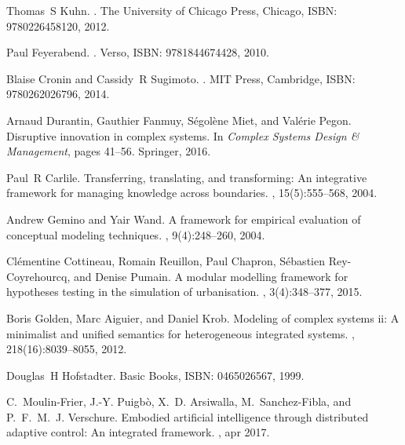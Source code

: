 \documentclass[runningheads,a4paper]{llncs2e/llncs}
\begin{document}
\begin{thebibliography}{10}

Thomas~S Kuhn.
.
\newblock The University of Chicago Press, Chicago, ISBN: 9780226458120, 2012.

Paul Feyerabend.
.
\newblock Verso, ISBN: 9781844674428, 2010.

Blaise Cronin and Cassidy~R Sugimoto.
.
\newblock MIT Press, Cambridge, ISBN: 9780262026796, 2014.

Arnaud Durantin, Gauthier Fanmuy, S{\'e}gol{\`e}ne Miet, and Val{\'e}rie Pegon.
\newblock Disruptive innovation in complex systems.
\newblock In {\em Complex Systems Design \& Management}, pages 41--56.
  Springer, 2016.

Paul~R Carlile.
\newblock Transferring, translating, and transforming: An integrative framework
  for managing knowledge across boundaries.
, 15(5):555--568, 2004.

Andrew Gemino and Yair Wand.
\newblock A framework for empirical evaluation of conceptual modeling
  techniques.
, 9(4):248--260, 2004.

Cl{\'e}mentine Cottineau, Romain Reuillon, Paul Chapron, S{\'e}bastien
  Rey-Coyrehourcq, and Denise Pumain.
\newblock A modular modelling framework for hypotheses testing in the
  simulation of urbanisation.
, 3(4):348--377, 2015.

Boris Golden, Marc Aiguier, and Daniel Krob.
\newblock Modeling of complex systems ii: A minimalist and unified semantics
  for heterogeneous integrated systems.
, 218(16):8039--8055, 2012.

Douglas~H Hofstadter.
\newblock Basic Books, ISBN: 0465026567, 1999.

C.~{Moulin-Frier}, J.-Y. {Puigb{\`o}}, X.~D. {Arsiwalla}, M.~{Sanchez-Fibla},
  and P.~F.~M.~J. {Verschure}.
\newblock Embodied artificial intelligence through distributed adaptive
  control: An integrated framework.
, apr 2017.


\end{thebibliography}
\end{document}
